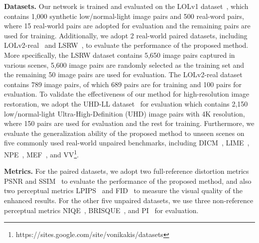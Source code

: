 \textbf{Datasets.} Our network is trained and evaluated on the LOLv1 dataset~\cite{RetinexNet}, which contains 1,000 synthetic low/normal-light image pairs and 500 real-word pairs, where 15 real-world pairs are adopted for evaluation and the remaining pairs are used for training. Additionally, we adopt 2 real-world paired datasets, including LOLv2-real~\cite{LOLV2} and LSRW~\cite{R2RNet}, to evaluate the performance of the proposed method. More specifically, the LSRW dataset contains 5,650 image pairs captured in various scenes, 5,600 image pairs are randomly selected as the training set and the remaining 50 image pairs are used for evaluation. The LOLv2-real dataset contains 789 image pairs, of which 689 pairs are for training and 100 pairs for evaluation. To validate the effectiveness of our method for high-resolution image restoration, we adopt the UHD-LL dataset~\cite{UHD_ICLR} for evaluation which contains 2,150 low/normal-light Ultra-High-Definition (UHD) image pairs with 4K resolution, where 150 pairs are used for evaluation and the rest for training. Furthermore, we evaluate the generalization ability of the proposed method to unseen scenes on five commonly used real-world unpaired benchmarks, including DICM~\cite{DICM}, LIME~\cite{LIME}, NPE~\cite{NPE}, MEF~\cite{MEF}, and VV\footnote{https://sites.google.com/site/vonikakis/datasets}.

\textbf{Metrics.} For the paired datasets, we adopt two full-reference distortion metrics PSNR and SSIM~\cite{SSIM} to evaluate the performance of the proposed method, and also two perceptual metrics LPIPS~\cite{LPIPS} and FID~\cite{fid} to measure the visual quality of the enhanced results. For the other five unpaired datasets, we use three non-reference perceptual metrics NIQE~\cite{NIQE}, BRISQUE~\cite{BRISQUE}, and PI~\cite{PI} for evaluation.

